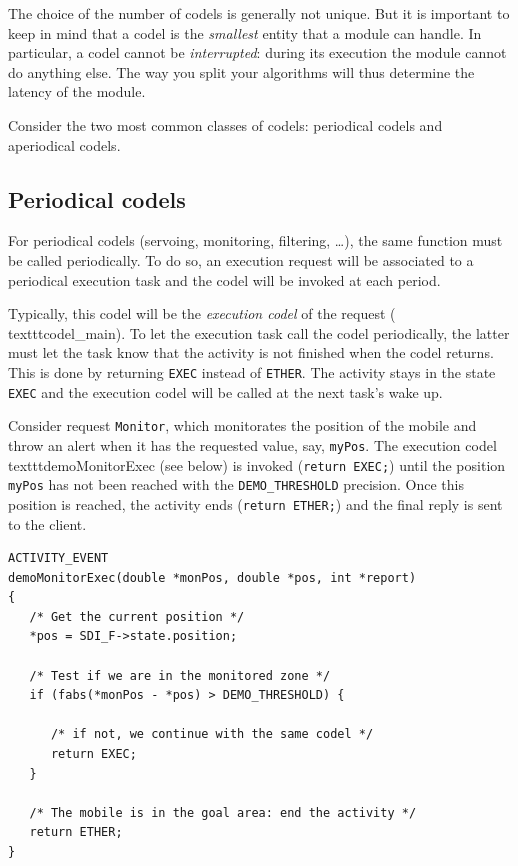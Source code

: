 The choice  of the number of  codels is generally  not unique.  But it is
important to keep in mind that a codel  is the \emph{smallest} entity that
a module can handle. In particular, a  codel cannot be \emph{interrupted}:
during  its execution the   module cannot do   anything else. The way you
split your algorithms will thus determine the latency of the module.

Consider  the two most  common classes of   codels: periodical codels and
aperiodical codels.

\subsection{Periodical codels}

For periodical codels (servoing, monitoring, filtering, \ldots), the same
function must be called periodically. To do so, an execution request will
be associated  to  a periodical  execution task  and  the  codel will  be
invoked at each period.

Typically, this codel  will be the \emph{execution codel} of the  request
(\\texttt{codel\_main}).  To let   the    execution task call   the  codel
periodically, the latter must let the task know that  the activity is not
finished  when the codel  returns.  This is done  by returning \texttt{EXEC}
instead  of \texttt{ETHER}.  The activity stays  in the state \texttt{EXEC} and
the execution codel will be called at the next task's wake up.

Consider request \texttt{Monitor},   which monitorates the position   of the
mobile and  throw an  alert when it   has the requested value, say,  
\texttt{myPos}.  The  execution codel  \\texttt{demoMonitorExec} (see below)  is invoked
(\texttt{return EXEC;}) until the position \texttt{myPos}  has not been reached
with the \texttt{DEMO\_THRESHOLD} precision. Once  this position is reached,
the activity ends (\texttt{return  ETHER;}) and the  final reply is sent  to
the client.

\begin{center}\begin{cartouche}\small\begin{verbatim}
ACTIVITY_EVENT
demoMonitorExec(double *monPos, double *pos, int *report)
{
   /* Get the current position */
   *pos = SDI_F->state.position;

   /* Test if we are in the monitored zone */
   if (fabs(*monPos - *pos) > DEMO_THRESHOLD) {

      /* if not, we continue with the same codel */
      return EXEC;
   }

   /* The mobile is in the goal area: end the activity */
   return ETHER;
}
\end{verbatim}\end{cartouche}\end{center}


